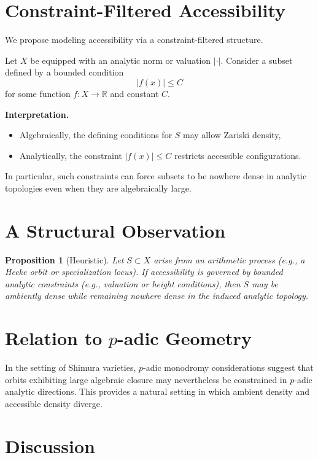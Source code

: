 \documentclass[11pt]{article}
\newtheorem{proposition}{Proposition}
\begin{document}
\section{Constraint-Filtered Accessibility}

We propose modeling accessibility via a constraint-filtered structure.

Let $X$ be equipped with an analytic norm or valuation $|\cdot|$. Consider a subset defined by a bounded condition
\[
|f(x)| \le C
\]
for some function $f : X \to \mathbb{R}$ and constant $C$.

\medskip

\noindent
\textbf{Interpretation.}
\begin{itemize}
    \item Algebraically, the defining conditions for $S$ may allow Zariski density,
    \item Analytically, the constraint $|f(x)| \le C$ restricts accessible configurations.
\end{itemize}

In particular, such constraints can force subsets to be nowhere dense in analytic topologies even when they are algebraically large.

\section{A Structural Observation}

\begin{proposition}[Heuristic]
Let $S \subset X$ arise from an arithmetic process (e.g., a Hecke orbit or specialization locus). If accessibility is governed by bounded analytic constraints (e.g., valuation or height conditions), then $S$ may be ambiently dense while remaining nowhere dense in the induced analytic topology.
\end{proposition}

\section{Relation to $p$-adic Geometry}

In the setting of Shimura varieties, $p$-adic monodromy considerations suggest that orbits exhibiting large algebraic closure may nevertheless be constrained in $p$-adic analytic directions. This provides a natural setting in which ambient density and accessible density diverge.

\section{Discussion}
\end{document}

